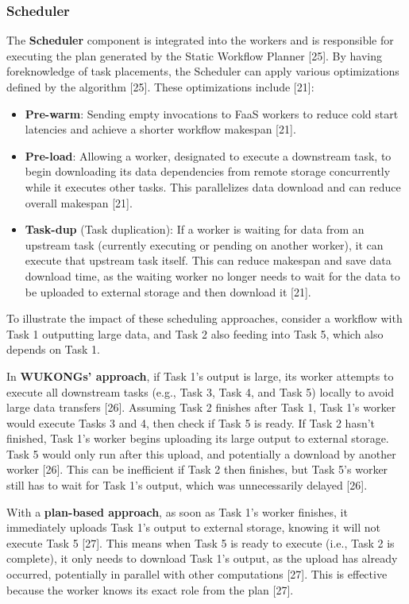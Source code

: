 \documentclass[conference]{IEEEtran}
\begin{document}
\subsubsection{Scheduler}
The \textbf{Scheduler} component is integrated into the workers and is responsible for executing the plan generated by the Static Workflow Planner [25]. By having foreknowledge of task placements, the Scheduler can apply various optimizations defined by the algorithm [25]. These optimizations include [21]:
\begin{itemize}
    \item \textbf{Pre-warm}: Sending empty invocations to FaaS workers to reduce cold start latencies and achieve a shorter workflow makespan [21].
    \item \textbf{Pre-load}: Allowing a worker, designated to execute a downstream task, to begin downloading its data dependencies from remote storage concurrently while it executes other tasks. This parallelizes data download and can reduce overall makespan [21].
    \item \textbf{Task-dup} (Task duplication): If a worker is waiting for data from an upstream task (currently executing or pending on another worker), it can execute that upstream task itself. This can reduce makespan and save data download time, as the waiting worker no longer needs to wait for the data to be uploaded to external storage and then download it [21].
\end{itemize}

To illustrate the impact of these scheduling approaches, consider a workflow with Task 1 outputting large data, and Task 2 also feeding into Task 5, which also depends on Task 1.

In \textbf{WUKONGs' approach}, if Task 1's output is large, its worker attempts to execute all downstream tasks (e.g., Task 3, Task 4, and Task 5) locally to avoid large data transfers [26]. Assuming Task 2 finishes after Task 1, Task 1's worker would execute Tasks 3 and 4, then check if Task 5 is ready. If Task 2 hasn't finished, Task 1's worker begins uploading its large output to external storage. Task 5 would only run after this upload, and potentially a download by another worker [26]. This can be inefficient if Task 2 then finishes, but Task 5's worker still has to wait for Task 1's output, which was unnecessarily delayed [26].

With a \textbf{plan-based approach}, as soon as Task 1's worker finishes, it immediately uploads Task 1's output to external storage, knowing it will not execute Task 5 [27]. This means when Task 5 is ready to execute (i.e., Task 2 is complete), it only needs to download Task 1's output, as the upload has already occurred, potentially in parallel with other computations [27]. This is effective because the worker knows its exact role from the plan [27].
\end{document}
